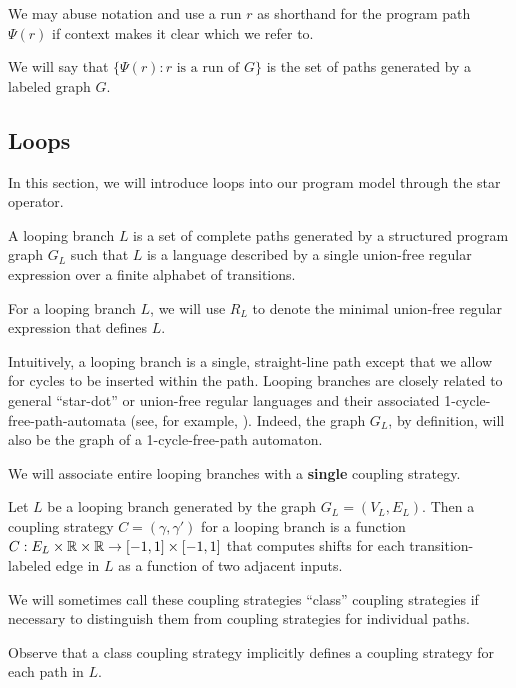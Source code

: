 We may abuse notation and use a run $r$ as shorthand for the program path $\Psi(r)$ if context makes it clear which we refer to. 

We will say that $\{\Psi(r): r\text{ is a run of }G\}$ is the set of paths generated by a labeled graph $G$. 

\subsection{Loops}

In this section, we will introduce loops into our program model through the star operator.

\begin{defn}
    A looping branch $L$ is a set of complete paths generated by a structured program graph $G_L$ such that $L$ is a language described by a single union-free regular expression over a finite alphabet of transitions. 
\end{defn}

For a looping branch $L$, we will use $R_L$ to denote the minimal union-free regular expression that defines $L$. 

Intuitively, a looping branch is a single, straight-line path except that we allow for cycles to be inserted within the path. Looping branches are closely related to general ``star-dot'' or union-free regular languages and their associated 1-cycle-free-path-automata (see, for example, \cite{nagy2006union}). Indeed, the graph $G_L$, by definition, will also be the graph of a 1-cycle-free-path automaton. 

We will associate entire looping branches with a \textbf{single} coupling strategy.

\begin{defn}
    Let $L$ be a looping branch generated by the graph $G_L = (V_L, E_L)$. Then a coupling strategy $C = (\gamma, \gamma')$ for a looping branch is a function $C:E_L\times\mathbb{R} \times\mathbb{R}\to [-1, 1]\times[-1, 1]$ that computes shifts for each transition-labeled edge in $L$ as a function of two adjacent inputs.
\end{defn}

We will sometimes call these coupling strategies ``class'' coupling strategies if necessary to distinguish them from coupling strategies for individual paths.

Observe that a class coupling strategy implicitly defines a coupling strategy for each path in $L$.

